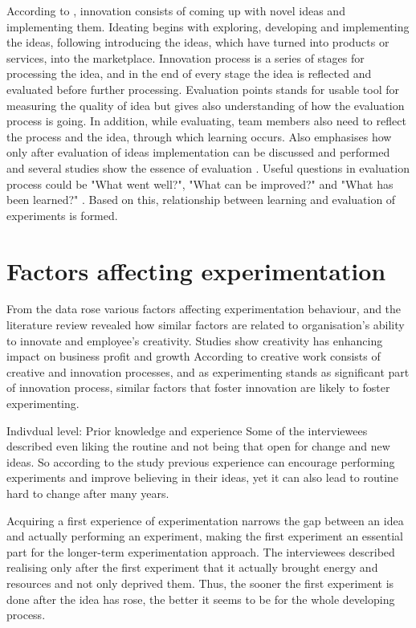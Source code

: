 According to \citet{buijs2007innovation}, innovation consists of coming up with novel ideas and implementing them. Ideating begins with exploring, developing and implementing the ideas, following introducing the ideas, which have turned into products or services, into the marketplace. Innovation process is a series of stages for processing the idea, and in the end of every stage the idea is reflected and evaluated before further processing. Evaluation points stands for usable tool for measuring the quality of idea but gives also understanding of how the evaluation process is going. In addition, while evaluating, team members also need to reflect the process and the idea, through which learning occurs. Also \citep{runco1994problem} emphasises how only after evaluation of ideas implementation can be discussed and performed and several studies show the essence of evaluation \citep{mumford2002leading,vincent2002divergent}. Useful questions in evaluation process could be "What went well?", "What can be improved?" and "What has been learned?" \citep{buijs2007innovation}. Based on this, relationship between learning and evaluation of experiments is formed. 

\section{Factors affecting experimentation} \label{fae}
From the data rose various factors affecting experimentation behaviour, and the literature review revealed how similar factors are related to organisation's ability to innovate and employee's creativity. Studies show creativity has enhancing impact on business profit and growth \citep{nystrom1990organizational} According to \citet{vincent2002divergent} creative work consists of creative and innovation processes, and as experimenting stands as significant part of innovation process, similar factors that foster innovation are likely to foster experimenting. 

Indivdual level: Prior knowledge and experience 
Some of the interviewees described even liking the routine and not being that open for change and new ideas. So according to the study previous experience can encourage performing experiments and improve believing in their ideas, yet it can also lead to routine hard to change after many years. 

Acquiring a first experience of experimentation narrows the gap between an idea and actually performing an experiment, making the first experiment an essential part for the longer-term experimentation approach. The interviewees described realising only after the first experiment that it actually brought energy and resources and not only deprived them. Thus, the sooner the first experiment is done after the idea has rose, the better it seems to be for the whole developing process.

